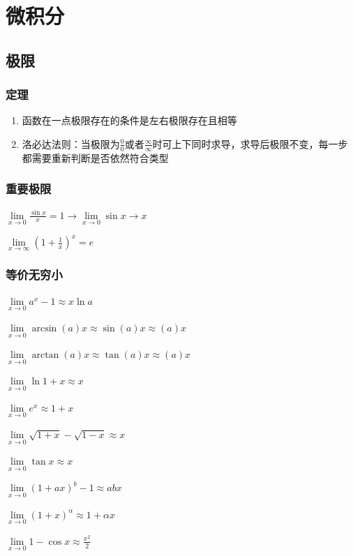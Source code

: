 \documentclass[UTF8]{ctexbook}
\newcommand{\limNormal}[1]{\lim\limits_{#1}}
\newcommand{\myLimToZero}{\limNormal{x \to 0}}
\newcommand{\myLimToInf}{\limNormal{x \to \infty}}
\begin{document}
{{}

\section{微积分}{

\subsection{极限}{

  \subsubsection{定理}{
    \begin{enumerate}
      \item 函数在一点极限存在的条件是左右极限存在且相等
      \item 洛必达法则：当极限为$\frac{0}{0}$或者$\frac{\infty}{\infty}$时可上下同时求导，求导后极限不变，每一步都需要重新判断是否依然符合类型
    \end{enumerate}
  }%

  \subsubsection{重要极限}{
    $\myLimToZero\frac{\sin{x}}{x}=1 \to \limNormal{x \to 0}\sin{x} \to x$

    $\myLimToInf(1+\frac{1}{x})^x = e$
  }%

  \subsubsection{等价无穷小}{
    $\myLimToZero a^x - 1 \approx x\ln{a}$

    $\myLimToZero \arcsin(a)x \approx \sin(a)x \approx (a)x$

    $\myLimToZero \arctan(a)x \approx \tan(a)x \approx (a)x$

    $\myLimToZero \ln1+x \approx x$

    $\myLimToZero e^x \approx 1+x$

    $\myLimToZero \sqrt{1 + x} - \sqrt{1 - x} \approx x$

    $\myLimToZero \tan{x} \approx x$

    $\myLimToZero (1 + ax)^b - 1 \approx abx$

    $\myLimToZero (1+x)^\alpha \approx 1+\alpha x$

    $\myLimToZero 1 - \cos x \approx \frac{x^2}{2}$

}}}}
\end{document}
